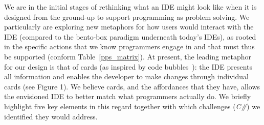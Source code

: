 
We are in the initial stages of rethinking what an IDE might look like when it is designed from the ground-up to support programming as problem solving. We particularly are exploring new metaphors for how users would interact with the IDE (compared to the bento-box paradigm underneath today's IDEs), as rooted in the specific actions that we know programmers engage in and that must thus be supported (conform Table~\ref{pps_matrix}). At present, the leading metaphor for our design is that of cards (as inspired by  code bubbles~\cite{bragdon2010bubbles}): the IDE presents all information and enables the developer to make changes through individual cards (see Figure 1).  We believe cards, and the affordances that they have, allows the envisioned IDE to better match what programmers actually do. We briefly highlight five key elements in this regard together with which challenges (\textit{C\#}) we identified they would address.

